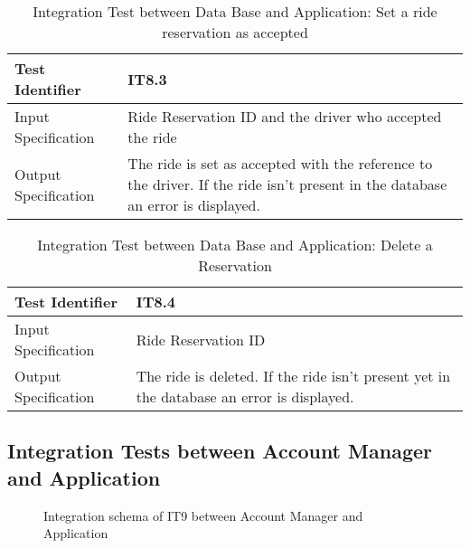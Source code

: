 \documentclass[a4paper]{article}
\begin{document}
\begin{table} [H]
\begin{center}
\begin{tabular}{| L | p{\rightcol} |}
  \hline
  Test Identifier & IT8.3 \\
  \hline
  Input Specification & Ride Reservation ID and the driver who accepted the ride\\
  \hline
  Output Specification & The ride is set as accepted with the reference to the driver. If the ride isn't present in the database an error is displayed.\\
  \hline
\end{tabular}
\end{center}
\caption{Integration Test between Data Base and Application: Set a ride reservation as accepted}
\end{table}

\begin{table} [H]
\begin{center}
\begin{tabular}{| L | p{\rightcol} |}
  \hline
  Test Identifier & IT8.4 \\
  \hline
  Input Specification & Ride Reservation ID\\
  \hline
  Output Specification & The ride is deleted. If the ride isn't present yet in the database an error is displayed.\\
  \hline
\end{tabular}
\end{center}
\caption{Integration Test between Data Base and Application: Delete a Reservation}
\end{table}

\subsection{Integration Tests between Account Manager and Application}

\begin{figure} [H]
\caption{Integration schema of IT9 between Account Manager and Application}
\end{figure}
\end{document}
